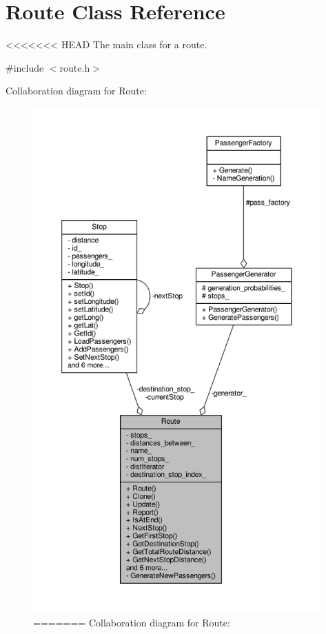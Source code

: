 \hypertarget{classRoute}{}\section{Route Class Reference}
\label{classRoute}


<<<<<<< HEAD
The main class for a route.  




{\ttfamily \#include $<$route.\+h$>$}



Collaboration diagram for Route\+:\nopagebreak
\begin{figure}[H]
\begin{center}
\leavevmode
\includegraphics[height=550pt]{classRoute__coll__graph}
=======
Collaboration diagram for Route\+:
\nopagebreak
\begin{figure}[H]

\end{figure}
\end{center}
\end{figure}
